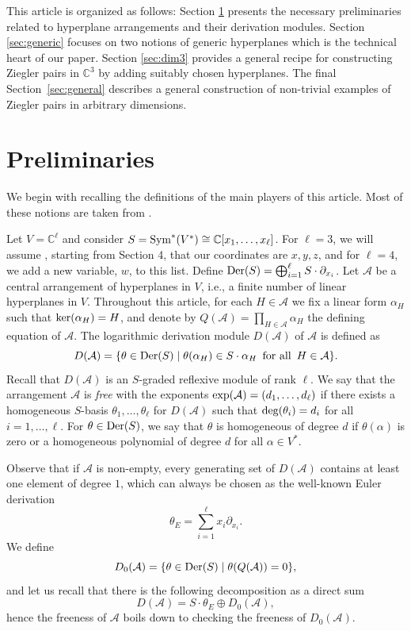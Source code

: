 \documentclass[a4paper,11pt]{amsart}
\def\A{{\mathcal{A}}}%
\numberwithin{equation}{section}
\theoremstyle{remark}
\begin{document}
This article is organized as follows: Section \ref{sec:prelim} presents the necessary preliminaries related to hyperplane arrangements and their derivation modules. Section \ref{sec:generic} focuses on two notions of generic hyperplanes which is the technical heart of our paper. Section \ref{sec:dim3} provides a general recipe for constructing Ziegler pairs in $\mathbb{C}^{3}$ by adding suitably chosen hyperplanes. The final Section~\ref{sec:general} describes a general construction of non-trivial examples of Ziegler pairs in arbitrary dimensions.

\section{Preliminaries}\label{sec:prelim}

We begin with recalling the definitions of the main players of this article. Most of these notions are taken from \cite{OT}.


Let $V = \mathbb{C}^{\ell}$ and consider $S = {\rm Sym}^{*}(V^{*}) \cong \mathbb{C}[x_{1}, \ldots , x_{\ell}]$.
For $\ell=3$, we will assume , starting from Section 4,  that our coordinates are $x, y, z$, and for $\ell=4$, we add a new variable, $w$, to this list.
Define ${\rm Der}(S) =\bigoplus_{i=1}^{\ell} S\cdot \partial_{x_{i}}$. Let $\mathcal{A}$ be a central arrangement of hyperplanes in $V$, i.e., a finite number of linear hyperplanes in $V$.
Throughout this article, for each $H \in \mathcal{A}$ we fix a linear form $\alpha_{H}$ such that ${\rm ker}(\alpha_{H}) = H$, and denote by $Q(\mathcal{A}) = \prod_{H \in \mathcal{A}}\alpha_{H}$ the defining equation of $\mathcal{A}$.
The logarithmic derivation module $D(\mathcal{A})$ of $\mathcal{A}$ is defined as
$$D(\mathcal{A}) = \{\theta \in {\rm Der}(S) \mid \theta(\alpha_{H}) \in S \cdot \alpha_{H} \,\text{ for all } \, H \in \mathcal{A}\}.$$
Recall that $D(\mathcal{A})$ is an $S$-graded reflexive module of rank $\ell$.
We say that the arrangement $\mathcal{A}$ is \emph{free} with the exponents ${\rm exp}(\A) = (d_{1}, \ldots ,d_{\ell})$ if there exists a homogeneous $S$-basis $\theta_{1}, \ldots , \theta_{\ell}$ for $D(\mathcal{A})$ such that ${\rm deg} (\theta_{i}) = d_{i}$ for all $i=1,\dots,\ell$.
For $\theta \in {\rm Der}(S)$, we say that $\theta$ is homogeneous of degree $d$ if 
$\theta(\alpha)$ is zero or a homogeneous polynomial of degree $d$ for all $\alpha \in V^{*}$. 

Observe that if $\mathcal{A}$ is non-empty, every generating set of $D(\mathcal{A})$ contains at least one element of degree $1$, which can always be chosen as the well-known Euler derivation
$$\theta_{E} = \sum_{i=1}^{\ell}x_{i} \partial_{x_{i}}.$$
We define 
$$D_{0}(\mathcal{A}) = \{\theta \in {\rm Der}(S) \mid \theta(Q(\mathcal{A})) = 0 \},$$
and let us recall that there is the following decomposition as a direct sum
$$D(\mathcal{A}) = S\cdot \theta_{E} \oplus D_{0}(\mathcal{A}),$$
hence the freeness of $\mathcal{A}$ boils down to checking the freeness of $D_{0}(\mathcal{A})$.
\end{document}

